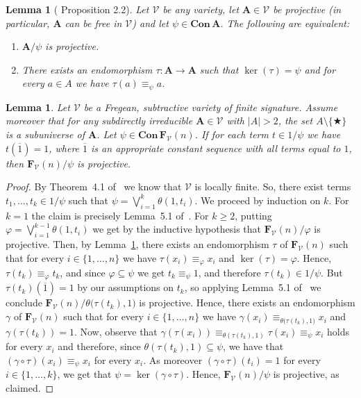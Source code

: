 \documentclass{amsart}
\newtheorem{lemma}[theorem]{Lemma}
\newcommand{\alg}[1]{\mathbf{#1}}
\newcommand{\FV}{\alg{F}_\mathcal{V}}
\newcommand{\Con}[1]{\mathbf{Con}\, #1}
\def\op{\bigstar}
\begin{document}
\begin{lemma}[\cite{Slo12} Proposition 2.2]\label{lem:Prop2.6}
Let $\mathcal{V}$ be any variety, let $\alg{A}\in\mathcal{V}$ be projective
\textup(in particular, $\alg{A}$ can be free in $\mathcal{V}$\textup) and let
$\psi\in\Con{\alg{A}}$. The following are equivalent:
\begin{enumerate}
\item $\alg{A}/\psi$ is projective.
\item There exists an endomorphism $\tau\colon \alg{A}\to\alg{A}$ such that
  $\ker(\tau) = \psi$ and for every $a\in A$
  we have $\tau(a)\equiv_\psi a$.  
\end{enumerate}  
\end{lemma}  


\begin{lemma}\label{lem:criteria}
Let $\mathcal{V}$ be a Fregean, subtractive variety of finite signature.
Assume moreover that for any subdirectly irreducible $\alg{A}\in\mathcal{V}$
with $|A|> 2$, the set $A\setminus\{\op\}$ is a subuniverse of $\alg{A}$.  
Let $\psi\in\Con\FV(n)$. If for each term $t\in 1/\psi$ we have
$t(\overline{1}) = 1$, where $\overline{1}$ is an appropriate constant sequence
with all terms equal to $1$, then $\FV(n)/\psi$ is projective.
\end{lemma}  

\begin{proof}
By Theorem~4.1 of~\cite{Slo12} we know that $\mathcal{V}$ is locally finite. 
So, there exist terms $t_1,\dots, t_k\in 1/\psi$ such that
$\psi = \bigvee_{i=1}^k\theta(1,t_i)$. We proceed by induction on $k$.
For $k=1$ the claim is precisely Lemma~5.1 of~\cite{Slo12}. For $k\geq 2$,
putting $\varphi = \bigvee_{i=1}^{k-1}\theta(1,t_i)$ we get by the inductive
hypothesis that $\FV(n)/\varphi$ is projective.
Then, by Lemma~\ref{lem:Prop2.6}, there exists an endomorphism $\tau$ of
$\FV(n)$ such that for every $i\in\{1,\dots,n\}$ 
we have $\tau(x_i)\equiv_{\varphi} x_i$ and $\ker(\tau) = \varphi$. 
Hence, $\tau(t_k)\equiv_{\varphi} t_k$, and since $\varphi\subseteq\psi$ we get
$t_k\equiv_\psi 1$, and therefore $\tau(t_k)\in 1/\psi$.
But $\tau(t_k)(\overline{1}) = 1$ by our assumptions on $t_k$, so
applying Lemma~5.1 of~\cite{Slo12} we conclude
$\FV(n)/\theta\bigl(\tau(t_k),1\bigr)$ is projective.
Hence, there exists
an endomorphism $\gamma$ of $\FV(n)$ such that 
for every $i\in\{1,\dots,n\}$
we have $\gamma(x_i)\equiv_{\theta\bigl(\tau(t_k),1\bigr)} x_i$ and
$\gamma(\tau(t_k)) = 1$.
Now, observe that
$\gamma(\tau(x_i))\equiv_{\theta(\tau(t_k),1)}\tau(x_i)
\equiv_{\psi} x_i$ holds for every $x_i$ and therefore, since
$\theta(\tau(t_k),1)\subseteq\psi$, we have that 
$(\gamma\circ\tau)(x_i)\equiv_\psi x_i$ for every $x_i$.  
As moreover $(\gamma\circ\tau)(t_i) = 1$ for every $i\in\{1,\dots,k\}$, we get that
$\psi = \ker(\gamma\circ\tau)$. Hence, $\FV(n)/\psi$ is projective, as claimed.
\end{proof}  
\end{document}
